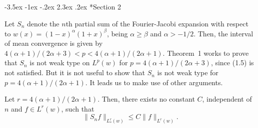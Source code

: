 \documentclass[10pt,a4paper]{article}
\makeatletter
\renewcommand\section{\@startsection {section}{1}{\z@}%
                                   {-3.5ex \@plus -1ex \@minus -.2ex}%
                                   {2.3ex \@plus.2ex}%
                                   {\centering \normalfont\large\scshape}}
\theoremstyle{plain}
\theoremstyle{remark}
\makeatother
\begin{document}
\section*{Section 2}

Let $S_{n}$ denote the $n$th partial sum of the Fourier-Jacobi expansion
with respect to $w(x) = (1-x)^{\alpha}(1+x)^{\beta}$, being
$\alpha \geq \beta$ and $\alpha > -1/2$. Then,
the interval of mean convergence is given by
$4(\alpha+1)/(2\alpha+3)  < p < 4(\alpha+1)/(2\alpha+1)$.
Theorem~1 works to prove that $S_{n}$ is not weak type on
$L^{p}(w)$ for $p = 4(\alpha+1)/(2\alpha+3)$,
since (1.5) is not satisfied. But it is not useful to show that
$S_{n}$ is not weak type for $p = 4(\alpha+1)/(2\alpha+1)$.
It leads us to make use of other arguments.

Let $r = 4(\alpha+1)/(2\alpha+1)$. Then,
there exists no constant $C$, independent of $n$ and $f \in L^{r}(w)$, such that
\begin{equation}
\|S_{n}f\|_{L^{r}_{*}(w)} \leq C\|f\|_{L^{r}(w)}.
\tag{2.1}
\end{equation}
\end{document}
